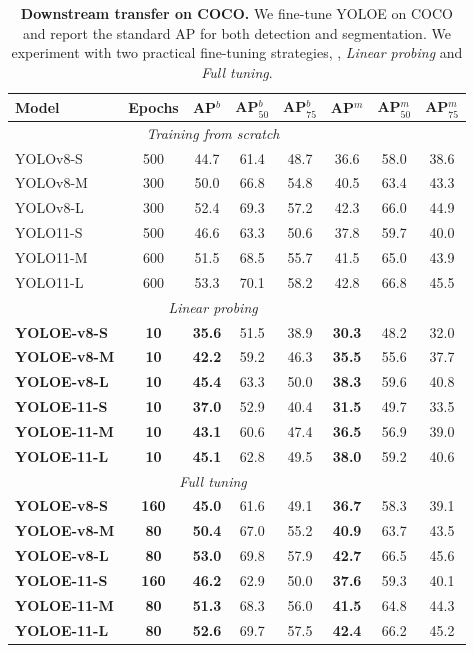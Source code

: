 \documentclass[10pt,twocolumn,letterpaper]{article}
\begin{document}
\begin{table}[t]
\centering
\caption{\textbf{Downstream transfer on COCO.} We fine-tune YOLOE on COCO and report the standard AP for both detection and segmentation. We experiment with two practical fine-tuning strategies, \ie, \textit{Linear probing} and \textit{Full tuning}.}
\label{tab:coco-tf}
\small
\setlength{\tabcolsep}{3pt}
\begin{tabular}{lccccccc} 
\toprule
Model & Epochs & AP$^b$ & AP$^b_{50}$ & AP$^b_{75}$ & AP$^m$ & AP$^m_{50}$ & AP$^m_{75}$ \\ 
\hline
\multicolumn{7}{c}{\textit{Training from scratch}} \\
YOLOv8-S & 500  & 44.7 & 61.4 & 48.7 & 36.6 & 58.0 & 38.6  \\
YOLOv8-M & 300 & 50.0 & 66.8 & 54.8 & 40.5 & 63.4 & 43.3  \\
YOLOv8-L & 300 & 52.4 & 69.3 & 57.2 & 42.3 & 66.0 & 44.9  \\
YOLO11-S & 500 & 46.6 & 63.3 & 50.6 & 37.8 & 59.7 & 40.0  \\
YOLO11-M & 600 & 51.5 & 68.5 & 55.7 & 41.5 & 65.0 & 43.9  \\
YOLO11-L & 600 & 53.3 & 70.1 & 58.2 & 42.8 & 66.8 & 45.5  \\ 
\hline
\multicolumn{7}{c}{\textit{Linear probing}} \\
\textbf{YOLOE-v8-S} & \textbf{10} & \textbf{35.6} & 51.5 & 38.9 & \textbf{30.3} & 48.2 & 32.0 \\
\textbf{YOLOE-v8-M} & \textbf{10} & \textbf{42.2} & 59.2 & 46.3 & \textbf{35.5} & 55.6 & 37.7 \\ 
\textbf{YOLOE-v8-L} & \textbf{10} & \textbf{45.4} & 63.3 & 50.0 & \textbf{38.3} & 59.6 & 40.8 \\
\textbf{YOLOE-11-S} & \textbf{10} & \textbf{37.0} & 52.9 & 40.4 & \textbf{31.5} & 49.7 & 33.5 \\
\textbf{YOLOE-11-M} & \textbf{10} & \textbf{43.1} & 60.6 & 47.4 & \textbf{36.5} & 56.9 & 39.0 \\
\textbf{YOLOE-11-L} & \textbf{10} & \textbf{45.1} & 62.8 & 49.5 & \textbf{38.0} & 59.2 & 40.6 \\ 
\hline
\multicolumn{7}{c}{\textit{Full tuning}} \\
\textbf{YOLOE-v8-S} & \textbf{160} & \textbf{45.0} & 61.6 & 49.1 & \textbf{36.7} & 58.3 & 39.1 \\
\textbf{YOLOE-v8-M} & \textbf{80} & \textbf{50.4} & 67.0 & 55.2 & \textbf{40.9} & 63.7 & 43.5 \\
\textbf{YOLOE-v8-L} & \textbf{80} & \textbf{53.0} & 69.8 & 57.9 & \textbf{42.7} & 66.5 & 45.6 \\
\textbf{YOLOE-11-S} & \textbf{160} & \textbf{46.2} & 62.9 & 50.0 & \textbf{37.6} & 59.3 & 40.1 \\
\textbf{YOLOE-11-M} & \textbf{80} & \textbf{51.3} & 68.3 & 56.0 & \textbf{41.5} & 64.8 & 44.3 \\
\textbf{YOLOE-11-L} & \textbf{80} & \textbf{52.6} & 69.7 & 57.5 & \textbf{42.4} & 66.2 & 45.2 \\
\bottomrule
\end{tabular}
\vspace{-5pt}
\end{table}
\end{document}
